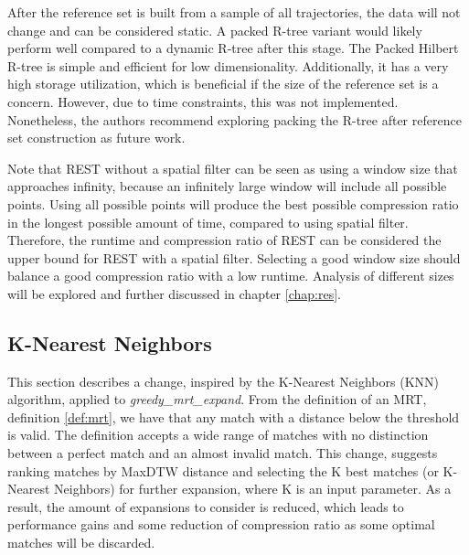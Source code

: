 After the reference set is built from a sample of all trajectories, the data will not change and can be considered static. A packed R-tree variant would likely perform well compared to a dynamic R-tree after this stage. The Packed Hilbert R-tree is simple and efficient for low dimensionality. Additionally, it has a very high storage utilization, which is beneficial if the size of the reference set is a concern. However, due to time constraints, this was not implemented. Nonetheless, the authors recommend exploring packing the R-tree after reference set construction as future work.

Note that REST without a spatial filter can be seen as using a window size that approaches infinity, because an infinitely large window will include all possible points. Using all possible points will produce the best possible compression ratio in the longest possible amount of time, compared to using spatial filter. Therefore, the runtime and compression ratio of REST can be considered the upper bound for REST with a spatial filter. Selecting a good window size should balance a good compression ratio with a low runtime. Analysis of different sizes will be explored and further discussed in chapter \ref{chap:res}.



\subsection{K-Nearest Neighbors}
This section describes a change, inspired by the K-Nearest Neighbors (KNN) algorithm, applied to \textit{greedy\_mrt\_expand}. From the definition of an MRT, definition \ref{def:mrt}, we have that any match with a distance below the threshold is valid. The definition accepts a wide range of matches with no distinction between a perfect match and an almost invalid match. This change, suggests ranking matches by MaxDTW distance and selecting the K best matches (or K-Nearest Neighbors) for further expansion, where K is an input parameter. As a result, the amount of expansions to consider is reduced, which leads to performance gains and some reduction of compression ratio as some optimal matches will be discarded.

